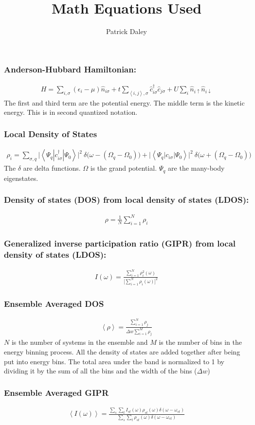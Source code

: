 \documentclass{article}
\title{Math Equations Used}
\author{Patrick Daley}
\def\exp#1{\left<#1\right>}
\begin{document}
\maketitle

\subsubsection*{Anderson-Hubbard Hamiltonian:}
\begin{align}
	H = \sum_{i,\sigma} (\epsilon_i - \mu)\hat{n}_{i \sigma} + t\sum_{\exp{i,j},\sigma} \hat{c}_{i\sigma}^{\dagger}\hat{c}_{j\sigma} + U\sum_{i}\hat{n}_{i \uparrow}\hat{n}_{i \downarrow}
\end{align}
The first and third term are the potential energy. The middle term is the kinetic energy. This is in second quantized notation.
\subsubsection*{Local Density of States}
\begin{align}
\rho_i = \sum_{\sigma,q}\big| \exp{\Psi_{q}|c_{i\sigma}^{\dagger}|\Psi_0}\big|^2 \ \delta \big(\omega - (\Omega_q - \Omega_0)\big) + \big|\exp{\Psi_{q}|c_{i\sigma}|\Psi_0}\big|^2 \ \delta \big(\omega + (\Omega_q - \Omega_0)\big) 
\end{align}
The $\delta$ are delta functions. $\Omega$ is the grand potential. $\Psi_q$ are the many-body eigenstates.
\subsubsection*{Density of states (DOS) from local density of states (LDOS):}
\begin{align}
\rho = \frac{1}{N} \sum_{i=1}^{N} \rho_i
\end{align}
\subsubsection*{Generalized inverse participation ratio (GIPR) from local density of states (LDOS):}
\begin{align}
I(\omega)= \frac{ \sum_{i=1}^{N} \rho_i^2(\omega)}{\big[ \sum_{i=1}^{N} \rho_i(\omega) \big]^2}
\end{align}
\subsubsection*{Ensemble Averaged DOS}
\begin{align}
\exp{\rho} = \frac{\sum_{i=1}^{N} \rho_j}{\Delta w \sum_{i=1}^{M} \rho_j}
\end{align}
$N$ is the number of systems in the ensemble and $M$ is the number of bins in the energy binning process. All the density of states are added together after being put into energy bins. The total area under the band is normalized to 1 by dividing it by the sum of all the bins and the width of the bins ($\Delta w$)
\subsubsection*{Ensemble Averaged GIPR}
\begin{align}
\exp{I(\omega)} = \frac{\sum_s \sum_t I_{st}(\omega)\rho_{st}(\omega)\delta(\omega-\omega_{st})}{\sum_s \sum_t \rho_{st}(\omega)\delta(\omega-\omega_{st})}
\end{align}
\end{document}
